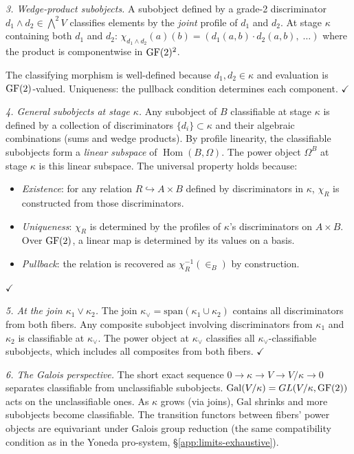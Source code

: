 \emph{3. Wedge-product subobjects.}
A subobject defined by a grade-2 discriminator
$d_1 \wedge d_2 \in \bigwedge^2 V$ classifies elements
by the \emph{joint} profile of $d_1$ and $d_2$.
At stage $\kappa$ containing both $d_1$ and $d_2$:
$\chi_{d_1 \wedge d_2}(a)(b) = (d_1(a,b) \cdot d_2(a,b),
\; \ldots)$ where the product is componentwise in
$\operatorname{GF}(2)^2$.

The classifying morphism is well-defined because
$d_1, d_2 \in \kappa$ and evaluation is
$\operatorname{GF}(2)$-valued. Uniqueness: the pullback condition
determines each component. $\checkmark$

\emph{4. General subobjects at stage $\kappa$.}
Any subobject of $B$ classifiable at stage $\kappa$ is
defined by a collection of discriminators $\{d_i\}
\subset \kappa$ and their algebraic combinations
(sums and wedge products). By profile linearity, the
classifiable subobjects form a \emph{linear subspace}
of $\operatorname{Hom}(B, \Omega)$. The power object
$\Omega^B$ at stage $\kappa$ is this linear subspace.
The universal property holds because:
\begin{itemize}[nosep]
  \item \emph{Existence}: for any relation
    $R \hookrightarrow A \times B$ defined by
    discriminators in $\kappa$, $\chi_R$ is constructed
    from those discriminators.
  \item \emph{Uniqueness}: $\chi_R$ is determined by
    the profiles of $\kappa$'s discriminators on
    $A \times B$. Over $\operatorname{GF}(2)$, a linear map is
    determined by its values on a basis.
  \item \emph{Pullback}: the relation is recovered as
    $\chi_R^{-1}(\in_B)$ by construction.
\end{itemize}
$\checkmark$

\emph{5. At the join $\kappa_1 \vee \kappa_2$.}
The join $\kappa_\vee = \mathrm{span}(\kappa_1 \cup
\kappa_2)$ contains all discriminators from both fibers.
Any composite subobject involving discriminators from
$\kappa_1$ and $\kappa_2$ is classifiable at $\kappa_\vee$.
The power object at $\kappa_\vee$ classifies all
$\kappa_\vee$-classifiable subobjects, which includes all
composites from both fibers. $\checkmark$

\emph{6. The Galois perspective.}
The short exact sequence $0 \to \kappa \to V \to
V/\kappa \to 0$ separates classifiable from
unclassifiable subobjects. $\mathrm{Gal}(V/\kappa)
= GL(V/\kappa, \operatorname{GF}(2))$ acts on the unclassifiable
ones. As $\kappa$ grows (via joins), $\mathrm{Gal}$
shrinks and more subobjects become classifiable.
The transition functors between fibers' power objects
are equivariant under Galois group reduction (the same
compatibility condition as in the Yoneda pro-system,
\S\ref{app:limits-exhaustive}).

